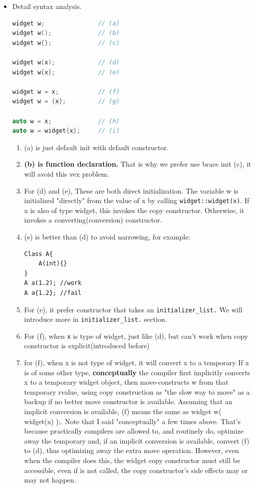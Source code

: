 \documentclass[a4paper,11pt,twoside]{book}
\begin{document}
\begin{itemize}
	
\item Detail syntax analysis.
\begin{lstlisting}[frame=single, language=c++,mathescape=true]
widget w;               // (a)
widget w();             // (b)
widget w{};             // (c)
	
widget w(x);            // (d)
widget w{x};            // (e)
	
widget w = x;           // (f)
widget w = {x};         // (g)
	
auto w = x;             // (h)
auto w = widget{x};     // (i)
\end{lstlisting}
	
	\begin{enumerate}
		\item (a) is just default init with default constructor.
		
		\item \textbf{(b) is function declaration.} That is why we prefer use brace init (c), it will avoid this vex problem.
		
		\item For (d) and (e), These are both direct initialization. The variable w is initialized "directly" from the value of x by calling \texttt{widget::widget(x)}. If x is also of type widget, this invokes the copy constructor. Otherwise, it invokes a converting(conversion) constructor.
		
		\item (e) is better than (d) to avoid narrowing, for example:
\begin{lstlisting}[numbers=none]
Class A{
	A(int){}
}
A a(1.2); //work
A a{1.2}; //fail
\end{lstlisting}
		\item For (e), it prefer constructor that takes an \texttt{initializer\_list.} We will introduce more in \texttt{initializer\_list.} section.
		
		\item For (f), when \texttt{x} is type of widget, just like (d), but can't work when copy constructor is explicit(introduced before)
		
		\item for (f), when x is not type of widget, it will convert x to a temporary If x is of some other type, \textbf{conceptually} the compiler first implicitly converts x to a temporary widget object, then move-constructs w from that temporary rvalue, using copy construction as "the slow way to move" as a backup if no better move constructor is available. Assuming that an implicit conversion is available, (f) means the same as widget w( widget(x) );. Note that I said "conceptually" a few times above. That's because practically compilers are allowed to, and routinely do, optimize away the temporary and, if an implicit conversion is available, convert (f) to (d), thus optimizing away the extra move operation. However, even when the compiler does this, the widget copy constructor must still be accessible, even if is not called, the copy constructor's side effects may or may not happen.


\end{enumerate}
\end{itemize}
\end{document}
